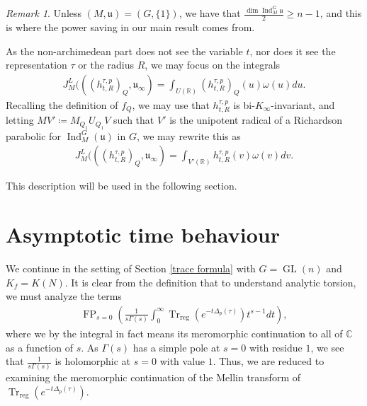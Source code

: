 \documentclass[11pt,reqno]{amsart}
\numberwithin{equation}{section}
\theoremstyle{definition}
\theoremstyle{remark}
\newtheorem{rmk}[thm]{Remark}
\newcommand{\GL}{\operatorname{GL}}
\newcommand{\Trreg}{\operatorname{Tr}_{\operatorname{reg}}}
\renewcommand{\dim}{\operatorname{dim}}
\newcommand{\Ind}{\operatorname{Ind}}
\newcommand{\FP}{\operatorname{FP}}
\newcommand{\mf}[1]{\mathfrak{#1}}
\newcommand{\C}{\mathbb{C}}
\newcommand{\R}{\mathbb{R}}
\begin{document}
\begin{rmk}
    Unless $(M,\mf{u})=(G,\lbrace 1\rbrace)$, we have that $\frac{\dim\Ind^G_M \mf{u}}{2}\geq n-1$, and this is where the power saving in our main result comes from.
\end{rmk}
\noindent As the non-archimedean part does not see the variable $t$, nor does it see the representation $\tau$ or the radius $R$, we may focus on the integrals
\begin{align}\label{inforbitcrude}
    J^{L}_M(((h^{\tau,p}_{t,R})_Q,\mf{u}_\infty) = \int_{U(\R)}(h^{\tau,p}_{t,R})_Q(u)\omega(u) du.
\end{align}
Recalling the definition of $f_Q$, we may use that $h^{\tau,p}_{t,R}$ is bi-$K_\infty$-invariant, and letting $MV'\coloneqq M_{Q_1}U_{Q_1}V$ such that $V'$ is the unipotent radical of a Richardson parabolic for $\Ind_M^G(\mf{u})$ in $G$, we may rewrite this as
\begin{align}\label{inforbit}
    J^{L}_M(((h^{\tau,p}_{t,R})_Q,\mf{u}_\infty) = \int_{V'(\R)}h^{\tau,p}_{t,R}(v)\omega(v) dv.
\end{align}

\noindent This description will be used in the following section.




\bigskip

\section{Asymptotic time behaviour}\label{asymptotics}
\noindent We continue in the setting of Section \ref{trace formula} with $G=\GL(n)$ and $K_f=K(N)$. It is clear from the definition that to understand analytic torsion, we must analyze the terms
\begin{align}\label{mellin}
    \FP_{s=0}\left(\frac{1}{s\Gamma(s)}\int_0^\infty \Trreg(e^{-t\Delta_p(\tau)})t^{s-1}dt\right),
\end{align}
where we by the integral in fact means its meromorphic continuation to all of $\C$ as a function of $s$. As $\Gamma(s)$ has a simple pole at $s=0$ with residue $1$, we see that $\frac{1}{s\Gamma(s)}$ is holomorphic at $s=0$ with value $1$. Thus, we are reduced to examining the meromorphic continuation of the Mellin transform of $\Trreg(e^{-t\Delta_p(\tau)})$.
\end{document}
